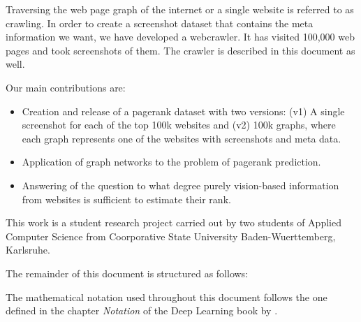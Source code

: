 Traversing the web page graph of the internet or a single website is referred to as crawling. In order to create a screenshot dataset that contains the meta information we want, we have developed a webcrawler. It has visited 100,000 web pages and took screenshots of them. The crawler is described in this document as well.

Our main contributions are:
\begin{itemize}
\item Creation and release of a pagerank dataset with two versions: (v1) A single screenshot for each of the top 100k websites and (v2) 100k graphs, where each graph represents one of the websites with screenshots and meta data.
\item Application of graph networks to the problem of pagerank prediction.
\item Answering of the question to what degree purely vision-based information from websites is sufficient to estimate their rank.
\end{itemize}

This work is a student research project carried out by two students of Applied Computer Science from Coorporative State University Baden-Wuerttemberg, Karlsruhe.

The remainder of this document is structured as follows: 

The mathematical notation used throughout this document follows the one defined in the chapter \textit{Notation} of the Deep Learning book by \cite{goodfellow:dlbook}.
